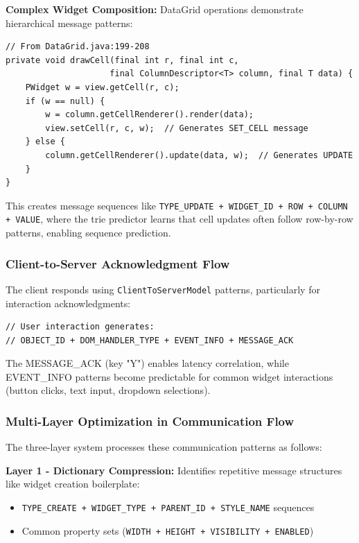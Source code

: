 \documentclass[12pt,a4paper]{article}
\begin{document}
\textbf{Complex Widget Composition:}
DataGrid operations demonstrate hierarchical message patterns:

\begin{lstlisting}[caption=DataGrid Cell Update Pattern]
// From DataGrid.java:199-208
private void drawCell(final int r, final int c, 
                     final ColumnDescriptor<T> column, final T data) {
    PWidget w = view.getCell(r, c);
    if (w == null) {
        w = column.getCellRenderer().render(data);
        view.setCell(r, c, w);  // Generates SET_CELL message
    } else {
        column.getCellRenderer().update(data, w);  // Generates UPDATE
    }
}
\end{lstlisting}

This creates message sequences like \texttt{TYPE\_UPDATE + WIDGET\_ID + ROW + COLUMN + VALUE}, where the trie predictor learns that cell updates often follow row-by-row patterns, enabling sequence prediction.

\subsubsection{Client-to-Server Acknowledgment Flow}

The client responds using \texttt{ClientToServerModel} patterns, particularly for interaction acknowledgments:

\begin{lstlisting}[caption=Client Acknowledgment Pattern]
// User interaction generates:
// OBJECT_ID + DOM_HANDLER_TYPE + EVENT_INFO + MESSAGE_ACK
\end{lstlisting}

The MESSAGE\_ACK (key "Y") enables latency correlation, while EVENT\_INFO patterns become predictable for common widget interactions (button clicks, text input, dropdown selections).

\subsubsection{Multi-Layer Optimization in Communication Flow}

The three-layer system processes these communication patterns as follows:

\textbf{Layer 1 - Dictionary Compression:} Identifies repetitive message structures like widget creation boilerplate:
\begin{itemize}
\item \texttt{TYPE\_CREATE + WIDGET\_TYPE + PARENT\_ID + STYLE\_NAME} sequences
\item Common property sets (\texttt{WIDTH + HEIGHT + VISIBILITY + ENABLED})
\end{itemize}
\end{document}
